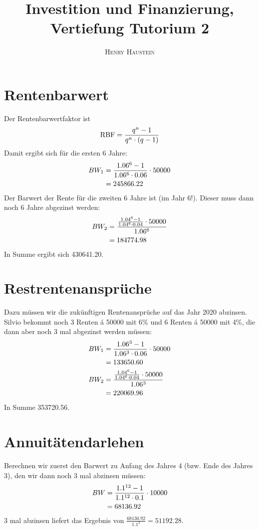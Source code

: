 \documentclass{article}
\title{\textbf{Investition und Finanzierung, Vertiefung Tutorium 2}}
\author{\textsc{Henry Haustein}}
\date{}
\DeclareMathOperator{\RBF}{RBF}
\begin{document}
	\maketitle
	
	\section*{Rentenbarwert}
	Der Rentenbarwertfaktor ist
	\begin{align}
		\RBF = \frac{q^n - 1}{q^n\cdot (q-1)} \notag
	\end{align}
	Damit ergibt sich für die ersten 6 Jahre:
	\begin{align}
		BW_1 &= \frac{1.06^6-1}{1.06^6\cdot 0.06}\cdot 50000 \notag \\
		&= 245866.22 \notag
	\end{align}
	Der Barwert der Rente für die zweiten 6 Jahre ist (im Jahr 6!). Dieser muss dann noch 6 Jahre abgezinst werden:
	\begin{align}
		BW_2 &= \frac{\frac{1.04^6-1}{1.04^6\cdot 0.04}\cdot 50000}{1.06^6} \notag \\
		&= 184774.98 \notag
	\end{align}
	In Summe ergibt sich 430641.20.

	\section*{Restrentenansprüche}
	Dazu müssen wir die zukünftigen Rentenansprüche auf das Jahr 2020 abzinsen. Silvio bekommt noch 3 Renten á 50000 mit 6\% und 6 Renten á 50000 mit 4\%, die dann aber noch 3 mal abgezinst werden müssen:
	\begin{align}
		BW_1 &= \frac{1.06^3-1}{1.06^3\cdot 0.06}\cdot 50000 \notag \\
		&= 133650.60 \notag \\
		BW_2 &= \frac{\frac{1.04^6-1}{1.04^6\cdot 0.04}\cdot 50000}{1.06^3} \notag \\
		&= 220069.96 \notag
	\end{align}
	In Summe 353720.56.

	\section*{Annuitätendarlehen}
	Berechnen wir zuerst den Barwert zu Anfang des Jahres 4 (bzw. Ende des Jahres 3), den wir dann noch 3 mal abzinsen müssen:
	\begin{align}
		BW &= \frac{1.1^{12} - 1}{1.1^{12}\cdot 0.1}\cdot 10000 \notag \\
		&= 68136.92 \notag
	\end{align}
	3 mal abzinsen liefert das Ergebnis von $\frac{68136.92}{1.1^3} = 51192.28$.
\end{document}
